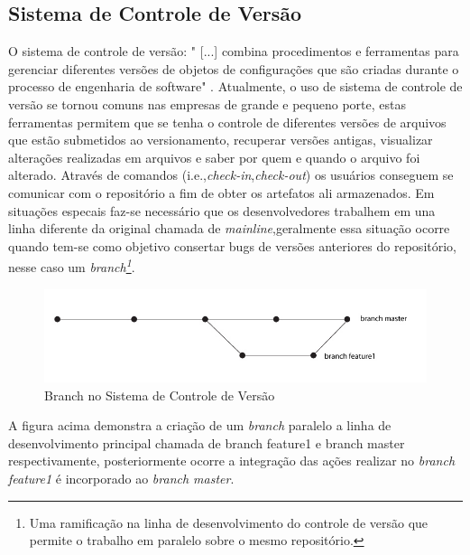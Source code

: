 \subsection{Sistema de Controle de Versão}
O sistema de controle de versão: "	[...] combina procedimentos e ferramentas para gerenciar diferentes versões de objetos de configurações que são criadas durante o processo de engenharia de software" .
Atualmente, o uso de sistema de controle de versão se tornou comuns nas empresas de grande e pequeno porte, estas ferramentas permitem que se tenha o controle de diferentes versões de arquivos que estão submetidos ao versionamento, recuperar versões antigas, visualizar alterações realizadas em arquivos e saber por quem e quando o arquivo foi alterado. Através de comandos (i.e.,\textit{check-in},\textit{check-out}) os usuários conseguem se comunicar com o repositório a fim de obter os artefatos ali armazenados. \cite{gleiph2011} Em situações especais faz-se necessário que os desenvolvedores trabalhem em una linha diferente da original chamada de \textit{mainline},geralmente essa situação ocorre quando tem-se como objetivo consertar bugs de versões anteriores do repositório, nesse caso um \textit{branch\footnote{Uma ramificação na linha de desenvolvimento do controle de versão que permite o trabalho em paralelo sobre o mesmo repositório.}}.
\begin{figure}[tbh]
\centering
\includegraphics[width=0.7\linewidth]{./images/branch}
\caption[Branch no Sistema de Controle de Versão]{Branch no Sistema de Controle de Versão}
\label{fig:Branch}
\end{figure}
A figura acima demonstra a criação de um \textit{branch} paralelo a linha de desenvolvimento principal chamada de branch feature1 e branch master respectivamente, posteriormente ocorre a integração das ações realizar no \textit{branch feature1} é incorporado ao \textit{branch master}.

